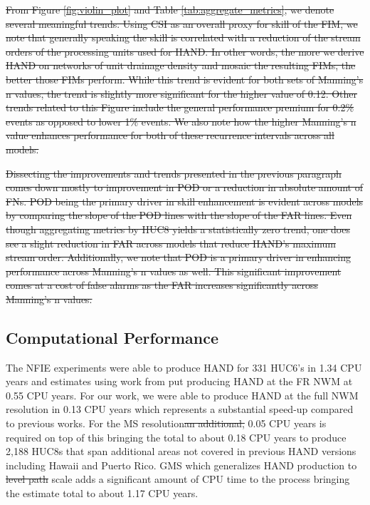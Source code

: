 \documentclass[draft]{dependencies/agujournal2019}
\providecommand{\DIFadd}[1]{{\protect\color{blue}\uwave{#1}}} %
\providecommand{\DIFdel}[1]{{\protect\color{red}\sout{#1}}}                      %
\providecommand{\DIFaddbegin}{} %
\providecommand{\DIFaddend}{} %
\providecommand{\DIFdelbegin}{} %
\providecommand{\DIFdelend}{} %
\begin{document}
\DIFdelbegin \DIFdel{From Figure \ref{fig:violin_plot} and Table \ref{tab:aggregate_metrics}, we denote several meaningful trends. 
Using CSI as an overall proxy for skill of the FIM, we note that generally speaking the skill is correlated with a reduction of the stream orders of the processing units used for HAND.
In other words, the more we derive HAND on networks of unit drainage density and mosaic the resulting FIMs, the better those FIMs perform.
While this trend is evident for both sets of Manning's n values, the trend is slightly more significant for the higher value of 0.12.
Other trends related to this Figure include the general performance premium for 0.2\% events as opposed to lower 1\% events.
We also note how the higher Manning's n value enhances performance for both of these recurrence intervals across all models.
}%

\DIFdel{Dissecting the improvements and trends presented in the previous paragraph comes down mostly to improvement in POD or a reduction in absolute amount of FNs.
POD being the primary driver in skill enhancement is evident across models by comparing the slope of the POD lines with the slope of the FAR lines.
Even though aggregating metrics by HUC8 yields a statistically zero trend, one does see a slight reduction in FAR across models that reduce HAND's maximum stream order.
Additionally, we note that POD is a primary driver in enhancing performance across Manning's n values as well.
This significant improvement comes at a cost of false alarms as the FAR increases significantly across Manning's n values.
}\DIFdelend %
\subsection{Computational Performance}
\label{ssec:compuational_performance}
%
The NFIE experiments were able to produce HAND for 331 HUC6's in 1.34 CPU years \cite{liu2016cybergis} and estimates using work from  put producing HAND at the FR NWM at 0.55 CPU years. 
For our work, we were able to produce HAND at the full NWM resolution in 0.13 CPU years which represents a substantial speed-up compared to previous works.
For the MS resolution\DIFdelbegin \DIFdel{an additional, }\DIFdelend \DIFaddbegin \DIFadd{, an additional }\DIFaddend 0.05 CPU years is required on top of this bringing the total to about 0.18 CPU years to produce 2,188 HUC8s that span additional areas not covered in previous HAND versions including Hawaii and Puerto Rico.
GMS which generalizes HAND production to \DIFdelbegin \DIFdel{level path }\DIFdelend \DIFaddbegin \DIFadd{the LP }\DIFaddend scale adds a significant amount of CPU time to the process bringing the estimate total to about 1.17 CPU years.
%
\clearpage %
\end{document}
